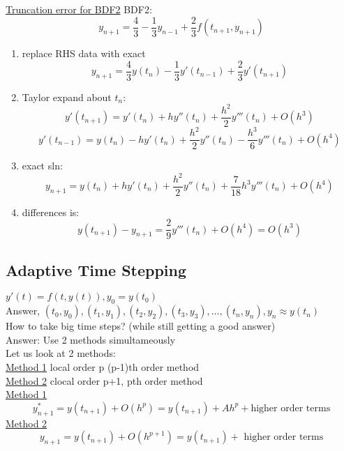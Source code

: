 \documentclass[10pt,usletter]{article}
\begin{document}
\underline{Truncation error for BDF2}
BDF2: $$y_{n+1}=\frac{4}{3}-\frac{1}{3}y_{n-1}+\frac{2}{3}f(t_{n+1},y_{n+1})$$
\begin{enumerate}
\item replace RHS data with exact $$y_{n+1}=\frac{4}{3}y(t_n)-\frac{1}{3}y'(t_{n-1})+\frac{2}{3}y'(t_{n+1})$$
\item Taylor expand about $t_n$:
$$y'(t_{n+1})=y'(t_n)+hy''(t_n)+\frac{h^2}{2}y'''(t_n)+O(h^3)$$
$$y'(t_{n-1})=y(t_n)-hy'(t_n)+\frac{h^2}{2}y''(t_n)-\frac{h^3}{6}y'''(t_n)+O(h^4)$$
\item exact sln:
$$y_{n+1}=y(t_n)+hy'(t_n)+\frac{h^2}{2}y''(t_n)+\frac{7}{18}h^3y'''(t_n)+O(h^4)$$
\item differences is:
$$y(t_{n+1})-y_{n+1}=\frac{2}{9}y'''(t_n)+O(h^4)=O(h^3)$$
\end{enumerate}



\subsection*{Adaptive Time Stepping}
$y'(t)=f(t,y(t)),y_0=y(t_0)$\\
Answer, $(t_0,y_0),(t_1,y_1),(t_2,y_2),(t_3,y_3),\hdots,(t_n,y_n), y_n \approx y(t_n)$\\
How to take big time steps? (while still getting a good answer)\\
Answer: Use 2 methods simultameously\\
Let us look at 2 methods:\\
\underline{Method 1} local order p (p-1)th order method\\
\underline{Method 2} clocal order p+1, pth order method\\

\underline{Method 1}\\
$$y_{n+1}^*=y(t_{n+1})+O(h^p)=y(t_{n+1})+Ah^p+\text{higher order terms}$$
\underline{Method 2}\\
$$y_{n+1}=y(t_{n+1})+O(h^{p+1})=y(t_{n+1})+\text{ higher order terms}$$
\end{document}
